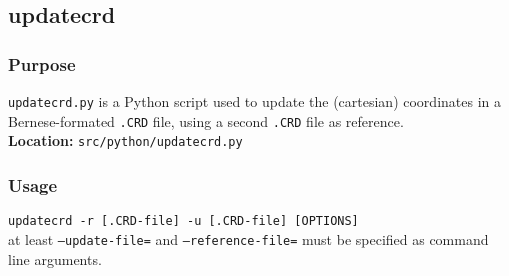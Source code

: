 \subsection{updatecrd}
\label{updatecrd}

\subsubsection{Purpose}
\texttt{updatecrd.py} is a Python script used to update the (cartesian) coordinates in a
Bernese-formated \texttt{.CRD} file, using a second \texttt{.CRD} file as reference.\\
\textbf{Location:} \texttt{src/python/updatecrd.py}

\subsubsection{Usage}
\texttt{updatecrd -r [.CRD-file] -u [.CRD-file] [OPTIONS]}\\
at least \texttt{--update-file=} and \texttt{--reference-file=}
must be specified as command line arguments.\\

